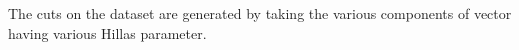 \documentclass[preprint,12pt]{elsarticle}
\begin{document}
The cuts on the dataset are generated by taking 
the various components of vector having various Hillas parameter. %
\end{document}
